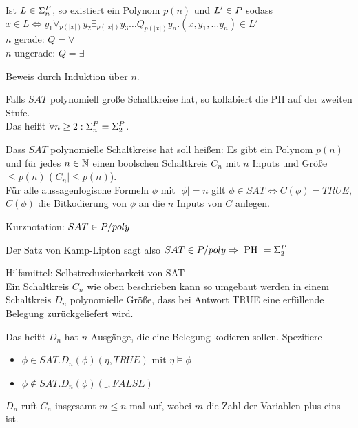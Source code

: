 \begin{satz}
    
    Ist $L \in \Sigma_n^{P}$, so existiert ein Polynom $p(n)$ und $L' \in P$ sodass\\
     $x \in L \Leftrightarrow y_1 \forall_{p(|x|)} y_2 \exists_{p(|x|)} y_3 \dots   Q_{p(|x|)} y_n . (x, y_1, \dots y_n) \in L'$\\
    $n$ gerade: $Q = \forall$\\
    $n$ ungerade: $Q = \exists$

\end{satz}

Beweis durch Induktion über $n$.











\begin{satz}


    Falls $SAT$ polynomiell große Schaltkreise hat, so kollabiert die PH auf der zweiten Stufe.\\
    Das heißt $\forall n \geq 2 : \Sigma_n^{P} = \Sigma_2^{P}$.


    Dass $SAT$ polynomielle Schaltkreise hat soll heißen: Es gibt ein Polynom $p(n)$ und für jedes $n \in \mathbb{N}$ einen boolschen Schaltkreis $C_n$ mit $n$ Inputs und Größe $\leq p(n)$ ($|C_n| \leq p(n)$).\\
    Für alle aussagenlogische Formeln $\phi$ mit $|\phi| = n$ gilt $\phi \in SAT \Leftrightarrow C(\phi) = TRUE$, $C(\phi)$ die Bitkodierung von $\phi$ an die $n$ Inputs von $C$ anlegen.
    
\end{satz}

Kurznotation: $SAT \in P / poly$

Der Satz von Kamp-Lipton sagt also $SAT \in P / poly \Rightarrow \text{ PH } = \Sigma_2^{P}$

Hilfsmittel: Selbstreduzierbarkeit von SAT\\
Ein Schaltkreis $C_n$ wie oben beschrieben kann so umgebaut werden in einem Schaltkreis $D_n$ polynomielle Größe, dass bei Antwort TRUE eine erfüllende Belegung zurückgeliefert wird.

Das heißt $D_n$ hat $n$ Ausgänge, die eine Belegung kodieren sollen. Spezifiere 
\begin{itemize}
    \item 
        $\phi \in SAT . D_n(\phi) (\eta, TRUE)$ mit $\eta \vDash \phi$
    \item 
        $\phi \notin SAT . D_n(\phi) (\_, FALSE)$
\end{itemize}
$D_n$ ruft $C_n$ insgesamt $m \leq n$ mal auf, wobei $m$ die Zahl der Variablen plus eins ist.

